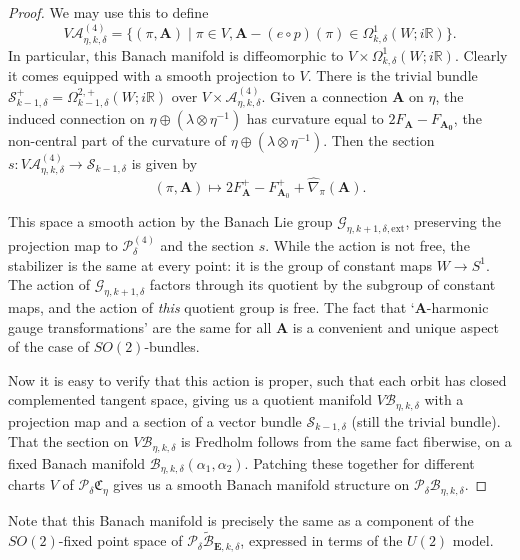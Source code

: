 \documentclass{memo-l}
\theoremstyle{definition}
\theoremstyle{remark}
\numberwithin{section}{chapter}
\numberwithin{equation}{chapter}
\begin{document}
\begin{proof}
We may use this to define $$V \mathcal A_{\eta,k,\delta}^{(4)} = \{(\pi, \mathbf{A}) \mid \pi \in V,  \mathbf{A} - (e\circ p)(\pi) \in \Omega^1_{k,\delta}(W;i\mathbb R)\}.$$ In particular, this Banach manifold is diffeomorphic to $V \times \Omega^1_{k,\delta}(W;i\mathbb R).$ Clearly it comes equipped with a smooth projection to $V$. There is the trivial bundle $\mathcal S_{k-1,\delta}^+ = \Omega^{2,+}_{k-1,\delta}(W;i\mathbb R)$ over $V \times \mathcal A_{\eta,k,\delta}^{(4)}.$ Given a connection $\mathbf{A}$ on $\eta$, the induced connection on $\eta \oplus (\lambda \otimes \eta^{-1})$ has curvature equal to $2F_{\mathbf{A}} - F_{\mathbf{A_0}}$, the non-central part of the curvature of $\eta \oplus (\lambda \otimes \eta^{-1})$. Then the section $s: V \mathcal A^{(4)}_{\eta, k, \delta} \to \mathcal S_{k-1, \delta}$ is given by $$(\pi, \mathbf{A}) \mapsto 2F_{\mathbf{A}}^+ - F_{\mathbf{A}_0}^+ + \widehat{\nabla}_\pi(\mathbf{A}).$$

This space a smooth action by the Banach Lie group $\mathcal G_{\eta, k+1,\delta,\text{ext}}$, preserving the projection map to $\mathcal P^{(4)}_{\delta}$ and the section $s$. While the action is not free, the stabilizer is the same at every point: it is the group of constant maps $W \to S^1$. The action of $\mathcal G_{\eta,k+1,\delta}$ factors through its quotient by the subgroup of constant maps, and the action of \emph{this} quotient group is free. The fact that `$\mathbf{A}$-harmonic gauge transformations' are the same for all $\mathbf{A}$ is a convenient and unique aspect of the case of $SO(2)$-bundles.

Now it is easy to verify that this action is proper, such that each orbit has closed complemented tangent space, giving us a quotient manifold $V \mathcal B_{\eta, k, \delta}$ with a projection map and a section of a vector bundle $\mathcal S_{k-1,\delta}$ (still the trivial bundle). That the section on $V \mathcal B_{\eta, k, \delta}$ is Fredholm follows from the same fact fiberwise, on a fixed Banach manifold $\mathcal B_{\eta, k, \delta}(\alpha_1, \alpha_2)$. Patching these together for different charts $V$ of $\mathcal P_{\delta} \mathfrak C_\eta$ gives us a smooth Banach manifold structure on $\mathcal P_{\delta} \mathcal B_{\eta, k, \delta}$.
\end{proof}

Note that this Banach manifold is precisely the same as a component of the $SO(2)$-fixed point space of $\mathcal P_{\delta} \widetilde{\mathcal B}_{\mathbf{E},k,\delta}$, expressed in terms of the $U(2)$ model.
\end{document}

